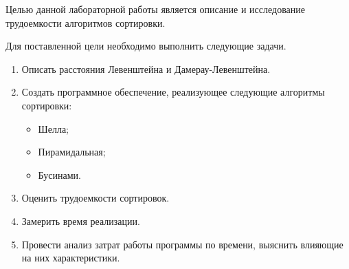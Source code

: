 Целью данной лабораторной работы является описание и исследование трудоемкости алгоритмов сортировки.

Для поставленной цели необходимо выполнить следующие задачи.
\begin{enumerate}
	\item Описать расстояния Левенштейна и Дамерау-Левенштейна.
	\item Создать программное обеспечение, реализующее следующие алгоритмы сортировки:
	\begin{itemize}
		\item Шелла;
		\item Пирамидальная;
		\item Бусинами.
	\end{itemize}
	\item Оценить трудоемкости сортировок.
	\item Замерить время реализации.
	\item Провести анализ затрат работы программы по времени, выяснить влияющие на них характеристики.
\end{enumerate}